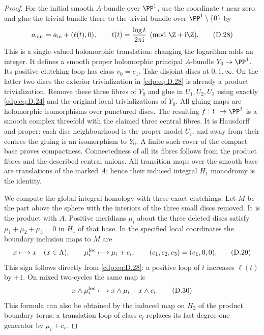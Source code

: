 \begin{proof}
For the initial smooth $A$-bundle over $\PP^1$, use the
coordinate $t$ near zero and glue the trivial bundle there
to the trivial bundle over $\PP^1\setminus\{0\}$ by
\[
 a_{\rm out}=a_{\rm in}+(\ell(t),0),
 \qquad \ell(t)=\frac{\log t}{2\pi\mathrm i}\pmod{\Z+\mathrm i\Z}.
\tag{D.28}\label{cdp:eq:D.28}
\]
This is a single-valued holomorphic translation: changing
the logarithm adds an integer. It defines a smooth proper
holomorphic principal $A$-bundle $Y_0\to\PP^1$.
Its positive clutching loop has class $v_0=e_1$.
Take disjoint discs at $0,1,\infty$. On the latter two
discs the exterior trivialization in \eqref{cdp:eq:D.28} is already a
product trivialization. Remove these three fibres of $Y_0$
and glue in $U_1,U_2,U_3$ using exactly \eqref{cdp:eq:D.24} and the
original local trivializations of $Y_0$. All gluing maps
are holomorphic isomorphisms over punctured discs. The
resulting $f:Y\to\PP^1$ is a smooth complex threefold with
the claimed three central fibres. It is Hausdorff and
proper: each disc neighbourhood is the proper model $U_i$,
and away from their centres the gluing is an isomorphism
to $Y_0$. A finite such cover of the compact base proves
compactness. Connectedness of all its fibres follows
from the product fibres and the described central unions.
All transition maps over the smooth base are translations
of the marked $A$; hence their induced integral $H_1$
monodromy is the identity.

We compute the global integral homology with these exact
clutchings. Let $M$ be the part above the sphere with the
interiors of the three small discs removed. It is the
product with $A$. Positive meridians $\mu_i$ about the
three deleted discs satisfy
$\mu_1+\mu_2+\mu_3=0$ in $H_1$ of that base. In the
specified local coordinates the boundary inclusion maps
to $M$ are
\[
 x\longmapsto x\quad(x\in\Lambda),\qquad
 \mu_i^{\rm loc}\longmapsto\mu_i+c_i,
 \qquad(c_1,c_2,c_3)=(e_1,0,0).
\tag{D.29}\label{cdp:eq:D.29}
\]
This sign follows directly from \eqref{cdp:eq:D.28}: a positive loop
of $t$ increases $\ell(t)$ by $+1$. On mixed
two-cycles the same map is
\[
 x\wedge\mu_i^{\rm loc}
       \longmapsto x\wedge\mu_i+x\wedge c_i.
\tag{D.30}\label{cdp:eq:D.30}
\]
This formula can also be obtained by the induced map on
$H_2$ of the product boundary torus; a translation loop
of class $c_i$ replaces its last degree-one generator
by $\mu_i+c_i$.


\end{proof}
